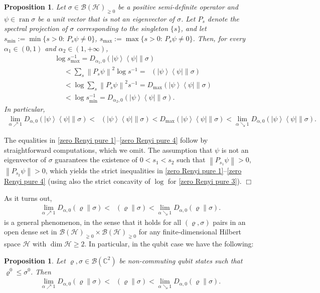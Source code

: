 \documentclass[unsortedaddress,superscriptaddress,pra,notitlepage]{revtex4}
\newtheorem{prop}[definition]{Proposition}
\newenvironment{proof}[1][Proof]{\begin{trivlist}
\item[\hskip \labelsep {\bfseries #1}]}{\hfill$\Box$\end{trivlist}}
\def\B{{\mathcal B}}
\def\bC{\mathbb{C}}
\def\rho{\varrho}
\def\hil{{\mathcal H}}
\def\inv{^{-1}}
\def\pne{_{\gneq 0}}
\newcommand{\ds}{\mbox{ }\mbox{ }}
\newcommand{\norm}[1]{\left\| #1\right\|}
\newcommand{\diad}[2]{\left|#1\right\rangle\!\left\langle #2\right|}
\newcommand{\pr}[1]{\diad{#1}{#1}}
\DeclareMathOperator{\ran}{ran}
\DeclareMathOperator{\DU}{\mathit{D}^{Um}}
\begin{document}
\begin{prop}\label{prop:zero Renyi pure}
Let $\sigma\in\B(\hil)\pne$ be a positive semi-definite operator and 
$\psi\in\ran\sigma$ be a unit 
vector that is not an eigenvector of $\sigma$. 
Let $P_s$ denote the spectral projection of $\sigma$ corresponding to the singleton
$\{s\}$, and let $s_{\min}:=\min\{s>0:\,P_s\psi\ne 0\}$, $s_{\max}:=\max\{s>0:\,P_s\psi\ne 0\}$.
Then, for every $\alpha_1\in(0,1)$ and $\alpha_2\in(1,+\infty)$,
\begin{align}
&\log s_{\max}\inv=D_{\alpha_1,0}(\pr{\psi}\|\sigma)
\label{zero Renyi pure 1}\\
&\ds<\sum_{s}\norm{P_s\psi}^2\log s\inv=\DU(\pr{\psi}\|\sigma)
\label{zero Renyi pure 2}\\
&\ds<\log\sum_{s}\norm{P_s\psi}^2 s\inv=D_{\max}(\pr{\psi}\|\sigma)
\label{zero Renyi pure 3}\\
&\ds<\log s_{\min}\inv=
D_{\alpha_2,0}(\pr{\psi}\|\sigma).
\label{zero Renyi pure 4}
\end{align}
In particular, 
\begin{align}
\lim_{\alpha\nearrow 1}D_{\alpha,0}(\pr{\psi}\|\sigma)
<\DU(\pr{\psi}\|\sigma)<D_{\max}(\pr{\psi}\|\sigma)
<\lim_{\alpha\searrow 1}D_{\alpha,0}(\pr{\psi}\|\sigma).
\end{align}
\end{prop}
\begin{proof}
The equalities in \eqref{zero Renyi pure 1}--\eqref{zero Renyi pure 4} follow by straightforward computations, which we omit. 
The assumption that $\psi$ is not an eigenvector of $\sigma$ guarantees the existence of 
$0<s_1< s_2$ such that $\norm{P_{s_1}\psi}>0$, $\norm{P_{s_2}\psi}>0$, 
which yields the strict inequalities in 
\eqref{zero Renyi pure 1}--\eqref{zero Renyi pure 4}
(using also the strict concavity of $\log$ for \eqref{zero Renyi pure 3}).
\end{proof}

As it turns out, 
\begin{align}\label{zero Renyi limit1}
\lim_{\alpha\nearrow 1}D_{\alpha,0}(\rho\|\sigma)
<\DU(\rho\|\sigma)
<\lim_{\alpha\searrow 1}D_{\alpha,0}(\rho\|\sigma).
\end{align}
is a general phenomenon, in the sense that it holds for all 
$(\rho,\sigma)$ pairs in an open dense set in $\B(\hil)\pne\times\B(\hil)\pne$
for any finite-dimensional Hilbert space $\hil$ with $\dim\hil\ge 2$. 
In particular,
in the qubit case we have the following:
\begin{prop}\label{prop:zero Renyi limit}
Let $\rho,\sigma\in\B(\bC^2)$ be non-commuting qubit states such that 
$\rho^0\le\sigma^0$. Then 
\begin{align*}
\lim_{\alpha\nearrow 1}D_{\alpha,0}(\rho\|\sigma)
< \DU(\rho\|\sigma)
< \lim_{\alpha\searrow 1}D_{\alpha,0}(\rho\|\sigma).
\end{align*}
\end{prop}
\end{document}
